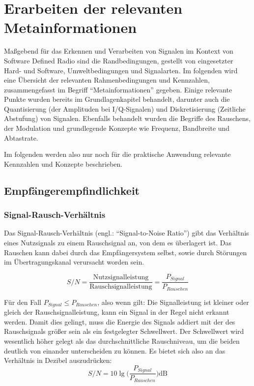\section{Erarbeiten der relevanten Metainformationen}
Maßgebend für das Erkennen und Verarbeiten von Signalen im Kontext von Software Defined Radio sind die Randbedingungen, gestellt von eingesetzter Hard- und Software, Umweltbedingungen und Signalarten.
Im folgenden wird eine Übersicht der relevanten Rahmenbedingungen und Kennzahlen, zusammengefasst im Begriff \enquote{Metainformationen} gegeben.
Einige relevante Punkte wurden bereits im Grundlagenkapitel behandelt, darunter auch die Quantisierung (der Amplituden bei I/Q-Signalen) und Diskretisierung (Zeitliche Abstufung) von Signalen.
Ebenfalls behandelt wurden die Begriffe des Rauschens, der Modulation und grundlegende Konzepte wie Frequenz, Bandbreite und Abtastrate.

Im folgenden werden also nur noch für die praktische Anwendung relevante Kennzahlen und Konzepte beschrieben.

\subsection{Empfängerempfindlichkeit}
\subsubsection{Signal-Rausch-Verhältnis}
Das Signal-Rausch-Verhältnis (engl.: \enquote{Signal-to-Noise Ratio}) gibt das Verhältnis eines Nutzsignals 
zu einem Rauschsignal an, von dem es überlagert ist. Das Rauschen kann dabei durch das Empfängersystem selbst, 
sowie durch Störungen im Übertragungskanal verursacht worden sein. %

\[ S/N = \frac{\text{Nutzsignalleistung}}{\text{Rauschsignalleistung}} = \frac{P_{Signal}}{P_{Rauschen}} \]


Für den Fall \(P_{Signal} \leq P_{Rauschen}\), also wenn gilt: 
Die Signalleistung ist kleiner oder gleich der Rauschsignalleistung, kann ein Signal in der Regel nicht erkannt werden.
Damit dies gelingt, muss die Energie des Signals addiert mit der des Rauschsignals größer sein als ein festgelegter Schwellwert.
Der Schwellwert wird wesentlich höher gelegt als das durchschnittliche Rauschniveau, um die beiden deutlich von einander unterscheiden zu können.
Es bietet sich also an das Verhältnis in Dezibel auszudrücken:
\[ S/N = 10 \lg \Big( \frac{P_{Signal}}{P_{Rauschen}} \Big) \text{dB}\] 



